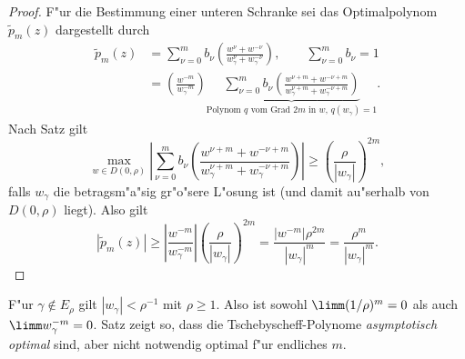 \begin{proof}
F"ur die Bestimmung einer unteren Schranke sei das Optimalpolynom $\widetilde{p}_m(z)$
dargestellt durch 
\begin{align*}
\widetilde{p}_m(z) 
&= \sum\limits_{\nu=0}^{m} b_{\nu}\left(\frac{w^{\nu}+w^{-\nu}}{w_{\gamma}^{\nu} 
		+ w_{\gamma}^{-\nu}} \right), \quad \quad \sum\limits_{\nu=0}^{m} b_{\nu}=1 \\
&= \left( \frac{ w^{-m} }{ w_{\gamma}^{-m} } \right) \underbrace{ \sum\limits_{\nu=0}^{m} b_{\nu}
		 \left( \frac{ w^{\nu+m} + w^{-\nu+m} }{ w_{\gamma}^{\nu+m} + w_{\gamma}^{-\nu+m} } \right)}_{\text{Polynom $q$ 
				vom Grad $2m$ in $w$, $q(w_\gamma)=1$}}.
\end{align*}
Nach Satz  gilt 
\[
\underset{w \in D(0,\rho)}{\max} \left| \sum\limits_{\nu=0}^{m} b_{\nu} \left( \frac{ w^{\nu+m} + w^{-\nu+m} }{ w_{\gamma}^{\nu+m} 
		+ w_{\gamma}^{-\nu+m} } \right)\right| \ge \left( \frac{\rho}{|w_{\gamma}|}\right)^{2m},
\]
falls $w_{\gamma}$ die betragsm"a"sig gr"o"sere L"osung ist (und damit au"serhalb von $D(0,\rho)$ liegt).
Also gilt
\[
\left| \widetilde{p}_m(z) \right| \ge \left| \frac{w^{-m}}{w_{\gamma}^{-m}}\right| \left(\frac{\rho}{|w_{\gamma}|}\right)^{2m} 
= \frac{\left| w^{-m} \right| \rho^{2m}}{\left| w_{\gamma} \right|^{m}}
= \frac{\rho^m}{|w_{\gamma}|^m}.
\]
\end{proof}

\begin{bem}
F"ur $\gamma \notin E_{\rho}$ gilt $|w_{\gamma}| < \rho^{-1}$ mit $\rho \ge 1$.
Also ist sowohl $\limm ( 1/\rho )^m = 0$ als auch $\limm w_{\gamma}^{-m} = 0$.
Satz  zeigt so, dass die Tschebyscheff-Polynome \emph{asymptotisch optimal} sind, aber nicht notwendig 
optimal f"ur endliches $m$.
\end{bem}
